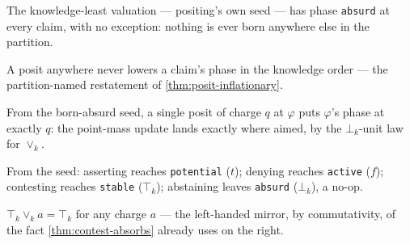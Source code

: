 \begin{theorem}\label{thm:phase-knowledgeleast}\leanok{}
The knowledge-least valuation --- positing's own seed --- has phase
\texttt{absurd} at every claim, with no exception: nothing is ever born
anywhere else in the partition.
\end{theorem}

\begin{theorem}\label{thm:phase-posit-le}\leanok{}
A posit anywhere never lowers a claim's phase in the knowledge order --- the
partition-named restatement of \cref{thm:posit-inflationary}.
\end{theorem}

\begin{theorem}\label{thm:phase-posit-knowledgeleast}\leanok{}
From the born-absurd seed, a single posit of charge \(q\) at \(\varphi\) puts
\(\varphi\)'s phase at exactly \(q\): the point-mass update lands exactly
where aimed, by the \(\bot_k\)-unit law for \(\vee_k\).
\end{theorem}

\begin{proposition}\label{thm:phase-belnap-reach}\leanok{}
From the seed: asserting reaches \texttt{potential} (\(t\)); denying reaches
\texttt{active} (\(f\)); contesting reaches \texttt{stable} (\(\top_k\));
abstaining leaves \texttt{absurd} (\(\bot_k\)), a no-op.
\end{proposition}

\begin{proposition}\label{thm:joink-ktop-left}\leanok{}
\(\top_k \vee_k a = \top_k\) for any charge \(a\) --- the left-handed mirror,
by commutativity, of the fact \cref{thm:contest-absorbs} already uses on the
right.
\end{proposition}

